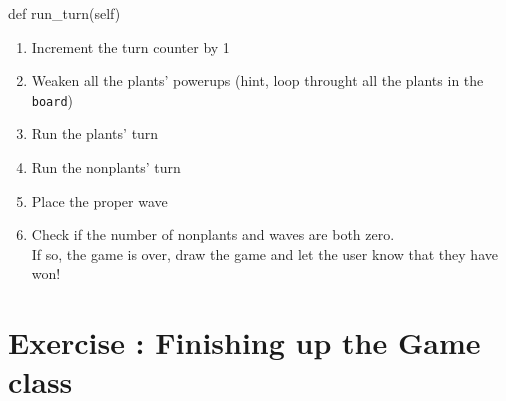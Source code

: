 \documentclass{42-en}
\begin{document}
\begin{enumerate}
\begin{42pycode}
def run_turn(self)
\end{42pycode}
        \begin{enumerate}\itemsep7pt
            \item Increment the turn counter by 1
            \item Weaken all the plants' powerups (hint, loop throught all the plants in the \texttt{board})
            \item Run the plants' turn
            \item Run the nonplants' turn
            \item Place the proper wave
            \item Check if the number of nonplants and waves are both zero.\\If so, the game is over, draw the game and let the user know that they have won!
         \end{enumerate}   
\end{enumerate}
\nextexercice
 \chapter{Exercise \exercicenumber: Finishing up the Game class}

\exnumber{\exercicenumber}
\end{document}
